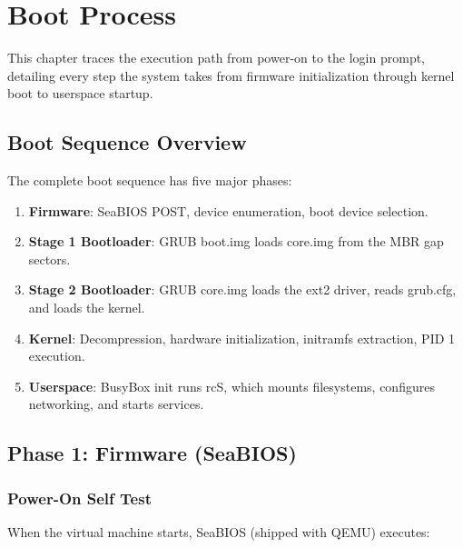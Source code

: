 \chapter{Boot Process}
\label{ch:boot}

This chapter traces the execution path from power-on to the login prompt,
detailing every step the system takes from firmware initialization through
kernel boot to userspace startup.

\section{Boot Sequence Overview}

The complete boot sequence has five major phases:

\begin{enumerate}[nosep]
  \item \textbf{Firmware}: SeaBIOS POST, device enumeration, boot device
        selection.
  \item \textbf{Stage 1 Bootloader}: GRUB boot.img loads core.img from
        the MBR gap sectors.
  \item \textbf{Stage 2 Bootloader}: GRUB core.img loads the ext2 driver,
        reads grub.cfg, and loads the kernel.
  \item \textbf{Kernel}: Decompression, hardware initialization, initramfs
        extraction, PID 1 execution.
  \item \textbf{Userspace}: BusyBox init runs rcS, which mounts filesystems,
        configures networking, and starts services.
\end{enumerate}

\section{Phase 1: Firmware (SeaBIOS)}

\subsection{Power-On Self Test}

When the virtual machine starts, SeaBIOS (shipped with QEMU) executes:

